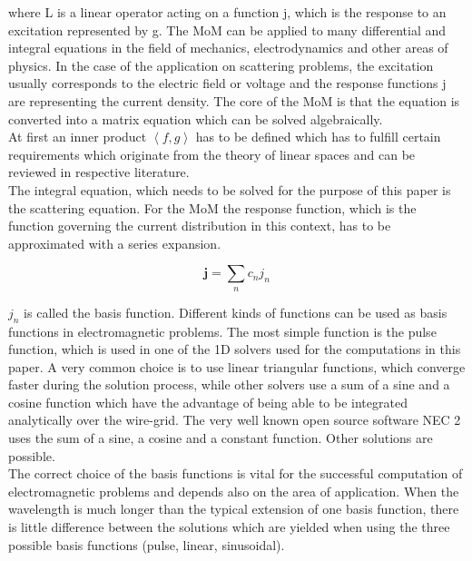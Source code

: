 \documentclass[a4paper,11pt]{article}
\begin{document}
where L is a linear operator acting on a function j, which is the response to an excitation represented by g. The MoM can be applied to many differential and integral equations in the field of mechanics, electrodynamics and other areas of physics. In the case of the application on scattering problems, the excitation usually corresponds to the electric field or voltage and the response functions j are representing the current density. The core of the MoM is that the equation is converted into a matrix equation which can be solved algebraically.\\

At first an inner product $\left\langle f,g\right\rangle$ has to be defined which has to fulfill certain requirements which originate from the theory of linear spaces and can be reviewed in respective literature.\\

The integral equation, which needs to be solved for the purpose of this paper is the scattering equation. For the MoM the response function, which is the function governing the current distribution in this context, has to be approximated with a series expansion.

\begin{equation}\label{eq:bas_funct_expans}
 \mathbf{j}=\sum_{n} c_n j_n
\end{equation}

$j_n$ is called the basis function. Different kinds of functions can be used as basis functions in electromagnetic problems. The most simple function is the pulse function, which is used in one of the 1D solvers used for the computations in this paper. A very common choice is to use linear triangular functions, which converge faster during the solution process, while other solvers use a sum of a sine and a cosine function which have the advantage of being able to be integrated analytically over the wire-grid. The very well known open source software NEC 2 uses the sum of a sine, a cosine and a constant function. Other solutions are possible.\\

The correct choice of the basis functions is vital for the successful computation of electromagnetic problems and depends also on the area of application. When the wavelength is much longer than the typical extension of one basis function, there is little difference between the solutions which are yielded when using the three possible basis functions (pulse, linear, sinusoidal).\\
\end{document}
